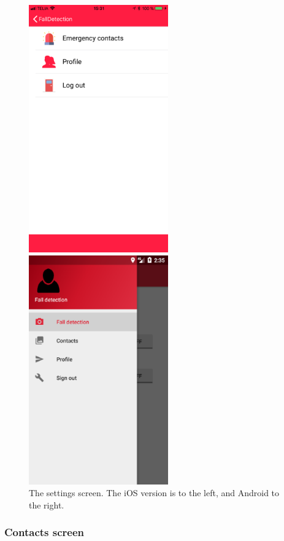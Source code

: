 \documentclass[12pt, a4paper, onecolumn]{article}
\begin{document}
	\begin{figure}[H]
		\begin{multicols}{2}
			\centering
			\includegraphics[width=6cm]{../img/screenshots/settings-screen.jpg}\par 
			\includegraphics[width=6cm]{../img/screenshots/settings-screen-android.png}\par 
		\end{multicols}
		\caption{The settings screen. The iOS version is to the left, and Android to the right.}%
		\label{fig:settings-screen}%
	\end{figure}
	
	\newpage
	\subsubsection{Contacts screen}
	
\end{document}
